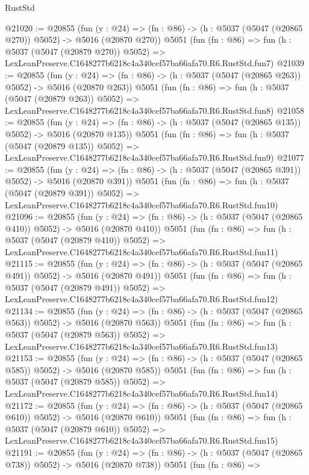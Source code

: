 \begin{lexlean}{RustStd}
\begin{coremodule}
@21020 := @20855
    (fun (y : @24) => (fn : @86) -> (h : @5037 (@5047 (@20865 @270)) @5052) -> @5016 (@20870 @270))
    @5051
    (fun (fn : @86) =>
    fun (h : @5037 (@5047 (@20879 @270)) @5052) =>
    LexLeanPreserve.C1648277b6218c4a340cef57ba66afa70.R6.RustStd.fun7)
@21039 := @20855
    (fun (y : @24) => (fn : @86) -> (h : @5037 (@5047 (@20865 @263)) @5052) -> @5016 (@20870 @263))
    @5051
    (fun (fn : @86) =>
    fun (h : @5037 (@5047 (@20879 @263)) @5052) =>
    LexLeanPreserve.C1648277b6218c4a340cef57ba66afa70.R6.RustStd.fun8)
@21058 := @20855
    (fun (y : @24) => (fn : @86) -> (h : @5037 (@5047 (@20865 @135)) @5052) -> @5016 (@20870 @135))
    @5051
    (fun (fn : @86) =>
    fun (h : @5037 (@5047 (@20879 @135)) @5052) =>
    LexLeanPreserve.C1648277b6218c4a340cef57ba66afa70.R6.RustStd.fun9)
@21077 := @20855
    (fun (y : @24) => (fn : @86) -> (h : @5037 (@5047 (@20865 @391)) @5052) -> @5016 (@20870 @391))
    @5051
    (fun (fn : @86) =>
    fun (h : @5037 (@5047 (@20879 @391)) @5052) =>
    LexLeanPreserve.C1648277b6218c4a340cef57ba66afa70.R6.RustStd.fun10)
@21096 := @20855
    (fun (y : @24) => (fn : @86) -> (h : @5037 (@5047 (@20865 @410)) @5052) -> @5016 (@20870 @410))
    @5051
    (fun (fn : @86) =>
    fun (h : @5037 (@5047 (@20879 @410)) @5052) =>
    LexLeanPreserve.C1648277b6218c4a340cef57ba66afa70.R6.RustStd.fun11)
@21115 := @20855
    (fun (y : @24) => (fn : @86) -> (h : @5037 (@5047 (@20865 @491)) @5052) -> @5016 (@20870 @491))
    @5051
    (fun (fn : @86) =>
    fun (h : @5037 (@5047 (@20879 @491)) @5052) =>
    LexLeanPreserve.C1648277b6218c4a340cef57ba66afa70.R6.RustStd.fun12)
@21134 := @20855
    (fun (y : @24) => (fn : @86) -> (h : @5037 (@5047 (@20865 @563)) @5052) -> @5016 (@20870 @563))
    @5051
    (fun (fn : @86) =>
    fun (h : @5037 (@5047 (@20879 @563)) @5052) =>
    LexLeanPreserve.C1648277b6218c4a340cef57ba66afa70.R6.RustStd.fun13)
@21153 := @20855
    (fun (y : @24) => (fn : @86) -> (h : @5037 (@5047 (@20865 @585)) @5052) -> @5016 (@20870 @585))
    @5051
    (fun (fn : @86) =>
    fun (h : @5037 (@5047 (@20879 @585)) @5052) =>
    LexLeanPreserve.C1648277b6218c4a340cef57ba66afa70.R6.RustStd.fun14)
@21172 := @20855
    (fun (y : @24) => (fn : @86) -> (h : @5037 (@5047 (@20865 @610)) @5052) -> @5016 (@20870 @610))
    @5051
    (fun (fn : @86) =>
    fun (h : @5037 (@5047 (@20879 @610)) @5052) =>
    LexLeanPreserve.C1648277b6218c4a340cef57ba66afa70.R6.RustStd.fun15)
@21191 := @20855
    (fun (y : @24) => (fn : @86) -> (h : @5037 (@5047 (@20865 @738)) @5052) -> @5016 (@20870 @738))
    @5051
    (fun (fn : @86) =>

\end{coremodule}
\end{lexlean}
